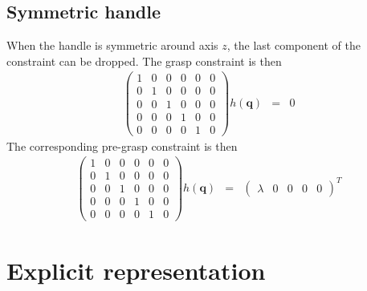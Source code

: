 \documentclass {article}
\newcommand\conf{\mathbf{q}}
\begin{document}
\subsection {Symmetric handle}

When the handle is symmetric around axis $z$, the last component of the constraint can be dropped. The grasp constraint is then
\begin {eqnarray}\label {eq:symmetric-handle}
  \left(\begin{array}{cccccc}
    1 & 0 & 0 & 0 & 0 & 0 \\
    0 & 1 & 0 & 0 & 0 & 0 \\
    0 & 0 & 1 & 0 & 0 & 0 \\
    0 & 0 & 0 & 1 & 0 & 0 \\
    0 & 0 & 0 & 0 & 1 & 0 \end{array}\right) h (\conf) &=& 0
\end {eqnarray}
The corresponding pre-grasp constraint is then
\begin {eqnarray}\label {eq:symmetric-handle-pregrasp}
  \left(\begin{array}{cccccc}
    1 & 0 & 0 & 0 & 0 & 0 \\
    0 & 1 & 0 & 0 & 0 & 0 \\
    0 & 0 & 1 & 0 & 0 & 0 \\
    0 & 0 & 0 & 1 & 0 & 0 \\
    0 & 0 & 0 & 0 & 1 & 0 \end{array}\right) h (\conf) &=&
  \left (\begin {array}{cccccc} \lambda & 0 & 0 & 0 & 0 \end{array}\right)^{T}
\end {eqnarray}

\section {Explicit representation}
\end{document}
